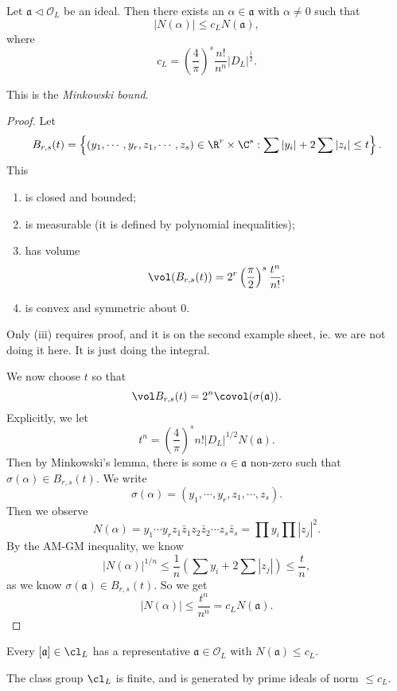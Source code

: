 \documentclass[a4paper]{article}
\begin{document}
\begin{prop}
  Let $\mathfrak{a} \lhd \mathcal{O}_L$ be an ideal. Then there exists an $\alpha \in \mathfrak{a}$ with $\alpha \not= 0$ such that
  \[
    |N(\alpha)| \leq c_L N(\mathfrak{a}),
  \]
  where
  \[
    c_L = \left(\frac{4}{\pi}\right)^s \frac{n!}{n^n} |D_L|^{\frac{1}{2}}.
  \]\qedhere
\end{prop}
This is the \emph{Minkowski bound}.

\begin{proof}
  Let
  \[
    B_{r, s}(t) = \left\{(y_1, \cdots, y_r, z_1, \cdots, z_s) \in \R^r \times \C^s: \sum |y_i| + 2 \sum |z_i| \leq t\right\}.
  \]
  This
  \begin{enumerate}
    \item is closed and bounded;
    \item is measurable (it is defined by polynomial inequalities);
    \item has volume
      \[
        \vol(B_{r, s}(t)) = 2^r \left(\frac{\pi}{2}\right)^s \frac{t^n}{n!};
      \]
    \item is convex and symmetric about $0$.
  \end{enumerate}
  Only (iii) requires proof, and it is on the second example sheet, ie. we are not doing it here. It is just doing the integral.

  We now choose $t$ so that
  \[
    \vol B_{r, s}(t) = 2^n \covol(\sigma(\mathfrak{a})).
  \]
  Explicitly, we let
  \[
    t^n = \left(\frac{4}{\pi}\right)^s n! |D_L|^{1/2}N(\mathfrak{a}).
  \]
  Then by Minkowski's lemma, there is some $\alpha \in \mathfrak{a}$ non-zero such that $\sigma(\alpha) \in B_{r, s}(t)$. We write
  \[
    \sigma(\alpha) = (y_1, \cdots, y_r, z_1, \cdots, z_s).
  \]
  Then we observe
  \[
    N(\alpha) = y_1\cdots y_r z_1 \bar{z}_1 z_2 \bar{z}_2 \cdots z_s \bar{z}_s = \prod y_i \prod|z_j|^2.
  \]
  By the AM-GM inequality, we know
  \[
    |N(\alpha)|^{1/n} \leq \frac{1}{n}\left(\sum y_i + 2 \sum |z_j|\right) \leq \frac{t}{n},
  \]
  as we know $\sigma(\mathfrak{a}) \in B_{r, s}(t)$. So we get
  \[
    |N(\alpha)| \leq \frac{t^n}{n^n} = c_L N(\mathfrak{a}).
  \]
\end{proof}

\begin{cor}
  Every $[\mathfrak{a}] \in \cl_L$ has a representative $\mathfrak{a} \in \mathcal{O}_L$ with $N(\mathfrak{a}) \leq c_L$.
\end{cor}

\begin{thm}[Dirichlet]
  The class group $\cl_L$ is finite, and is generated by prime ideals of norm $\leq c_L$.
\end{thm}
\end{document}
